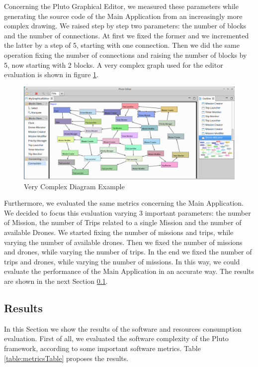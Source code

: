 Concerning the Pluto Graphical Editor, we measured these parameters while generating the source code of the Main Application from an increasingly more complex drawing. 
We raised step by step two parameters: the number of blocks and the number of connections.
At first we fixed the former and we incremented the latter by a step of 5, starting with one connection. Then we did the same operation fixing the number of connections and raising the number of blocks by 5, now starting with 2 blocks.
A very complex graph used for the editor evaluation is shown in figure \ref{fig:stressDiagram}.

\begin{figure}[H]
  \centering
  \includegraphics[width=\linewidth]{pictures/stressDiagram.png}
  \caption{Very Complex Diagram Example}
  \label{fig:stressDiagram}
\end{figure}

Furthermore, we evaluated the same metrics concerning the Main Application.
We decided to focus this evaluation varying 3 important parameters: the number of Mission, the number of Trips related to a single Mission and the number of available Drones. 
We started fixing the number of missions and trips, while varying the number of available drones. 
Then we fixed the number of missions and drones, while varying the number of trips. 
In the end we fixed the number of trips and drones, while varying the number of missions.
In this way, we could evaluate the performance of the Main Application in an accurate way.
The results are shown in the next Section \ref{metricsResult}.

\subsection{Results}
\label{metricsResult}

In this Section we show the results of the software and resources consumption evaluation.
First of all, we evaluated the software complexity of the Pluto framework, according to some important software metrics. Table \ref{table:metricsTable} proposes the results.


